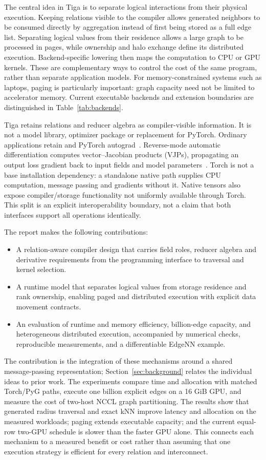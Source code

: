 The central idea in Tiga is to separate logical interactions from their physical
execution. Keeping relations visible to the compiler allows generated neighbors
to be consumed directly by aggregation instead of first being stored as a full
edge list. Separating logical values from their residence allows a large graph
to be processed in pages, while ownership and halo exchange define its
distributed execution. Backend-specific lowering then maps the computation to
CPU or GPU kernels. These are complementary ways to control the cost of the
same program, rather than separate application models. For memory-constrained
systems such as laptops, paging is particularly important: graph capacity need
not be limited to accelerator memory. Current executable backends and extension
boundaries are distinguished in Table~\ref{tab:backends}.

Tiga retains relations and reducer algebra as compiler-visible information.
It is not a model library, optimizer package or replacement for PyTorch.
Ordinary applications retain  and PyTorch
autograd~\cite{pytorch}. Reverse-mode automatic differentiation computes
vector--Jacobian products (VJPs), propagating an output loss gradient back to
input fields and model parameters~\cite{autodiff}. Torch is
not a base installation dependency: a standalone native path supplies CPU
computation, message passing and gradients without it. Native tensors also
expose compiler/storage functionality not uniformly available through Torch.
This split is an explicit interoperability boundary, not a claim that both
interfaces support all operations identically.

The report makes the following contributions:
\begin{itemize}
\item A relation-aware compiler design that carries field roles, reducer algebra
and derivative requirements from the programming interface to traversal and
kernel selection.
\item A runtime model that separates logical values from storage residence and
rank ownership, enabling paged and distributed execution with explicit data
movement contracts.
\item An evaluation of runtime and memory efficiency, billion-edge capacity,
and heterogeneous distributed execution, accompanied by numerical checks,
reproducible measurements, and a differentiable EdgeNN example.
\end{itemize}
The contribution is the integration of these mechanisms around a shared
message-passing representation; Section~\ref{sec:background} relates the
individual ideas to prior work.
The experiments compare time and allocation with matched Torch/PyG paths,
execute one billion explicit edges on a 16 GiB GPU, and measure the cost of
two-host NCCL graph partitioning. The results show that
generated radius traversal and exact kNN improve latency and allocation on the
measured workloads; paging extends executable capacity; and the current
equal-row two-GPU schedule is slower than the faster GPU alone. This connects
each mechanism to a measured benefit or cost rather than assuming that one
execution strategy is efficient for every relation and interconnect.

